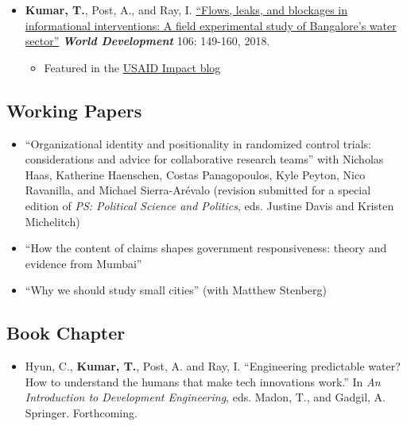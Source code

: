 \documentclass[11pt]{article}
\begin{document}
\begin{itemize}
\begin{itemize}
\end{itemize}

		\item[] \textbf{Kumar, T.}, Post, A., and Ray, I. \href{https://www.sciencedirect.com/science/article/pii/S0305750X1830032}{``Flows, leaks, and blockages in informational interventions: A field experimental study of Bangalore's water sector''} \textit{\textbf{World Development} }106: 149-160, 2018.
		\begin{itemize}[nosep]
		\item Featured in the \href{https://blog.usaid.gov/2016/05/using-mobile-phones-to-alert-households-waiting-for-nextdrop-of-water/}{USAID Impact blog}
		\end{itemize}
		

\end{itemize}

\subsection*{Working Papers}

\begin{itemize}




	

	\item[]``Organizational identity and positionality in randomized control trials: considerations and advice for collaborative research teams'' with Nicholas Haas, Katherine Haenschen, Costas Panagopoulos, Kyle Peyton, Nico Ravanilla, and Michael  Sierra-Ar\'{e}valo (revision submitted for a special edition of \textit{PS: Political Science and Politics}, eds. Justine Davis and Kristen Michelitch)
		

	\item[]``How the content of claims shapes government responsiveness: theory and evidence from Mumbai'' 
	\item[]``Why we should study small cities'' (with Matthew Stenberg)		

\end{itemize}

\subsection*{Book Chapter}
\begin{itemize}
	\item[]Hyun, C., \textbf{Kumar, T.}, Post, A. and Ray, I. ``Engineering predictable water? How to understand the humans that make tech innovations work.'' In \textit{An Introduction to Development Engineering}, eds. Madon, T., and Gadgil, A. Springer. Forthcoming.


	\end{itemize}
	
\end{document}

